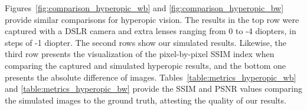 


Figures~\ref{fig:comparison_hyperopic_wb} and \ref{fig:comparison_hyperopic_bw} provide similar comparisons for hyperopic vision. The results in the top row were captured with a DSLR camera and extra lenses ranging from 0 to -4 diopters, in steps of -1 diopter. The second rows show our simulated results. Likewise, the third row presents the visualization of the pixel-by-pixel SSIM index when comparing the captured and simulated hyperopic results, and the bottom one presents the absolute difference of images. Tables~\ref{table:metrics_hyperopic_wb} and \ref{table:metrics_hyperopic_bw} provide the SSIM and PSNR values comparing the simulated images to the ground truth, attesting the quality of our results. 


